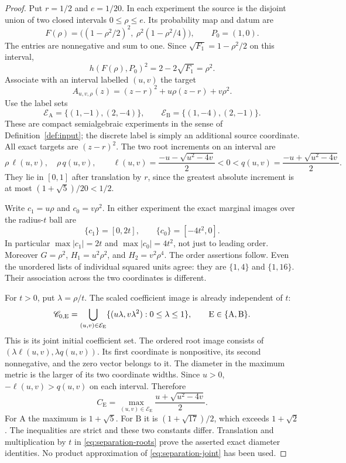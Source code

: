 \begin{proof}
Put $r=1/2$ and $e=1/20$. In each experiment the source is the disjoint
union of two closed intervals $0\le\rho\le e$. Its probability map and
datum are
\[
 F(\rho)=\bigl((1-\rho^2/2)^2,\ \rho^2(1-\rho^2/4)\bigr),
 \qquad P_0=(1,0).
\]
The entries are nonnegative and sum to one. Since
$\sqrt{F_1}=1-\rho^2/2$ on this interval,
\[
 h(F(\rho),P_0)^2=2-2\sqrt{F_1}=\rho^2.
\]
Associate with an interval labelled $(u,v)$ the target
\[
 A_{u,v,\rho}(z)=(z-r)^2+u\rho(z-r)+v\rho^2.
\]
Use the label sets
\[
 \mathcal E_{\mathrm A}=\{(1,-1),(2,-4)\},\qquad
 \mathcal E_{\mathrm B}=\{(1,-4),(2,-1)\}.
\]
These are compact semialgebraic experiments in the sense of
Definition~\ref{def:input}; the discrete label is simply an additional
source coordinate. All exact targets are $(z-r)^2$. The two root
increments on an interval are
\begin{equation}\label{eq:separation-roots}
 \rho\,\ell(u,v),\quad\rho\,q(u,v),\qquad
 \ell(u,v)=\frac{-u-\sqrt{u^2-4v}}2<0<
 q(u,v)=\frac{-u+\sqrt{u^2-4v}}2.
\end{equation}
They lie in $[0,1]$ after translation by $r$, since the greatest absolute
increment is at most $(1+\sqrt5)/20<1/2$.

Write $c_1=u\rho$ and $c_0=v\rho^2$. In either experiment the exact
marginal images over the radius-$t$ ball are
\[
 \{c_1\}=[0,2t],\qquad \{c_0\}=[-4t^2,0].
\]
In particular $\max|c_1|=2t$ and $\max|c_0|=4t^2$, not just to leading
order. Moreover $G=\rho^2$, $H_1=u^2\rho^2$, and
$H_2=v^2\rho^4$. The order assertions follow. Even the unordered lists
of individual squared units agree: they are $\{1,4\}$ and $\{1,16\}$.
Their association across the two coordinates is different.

For $t>0$, put $\lambda=\rho/t$. The scaled coefficient image is already
independent of $t$:
\begin{equation}\label{eq:separation-joint}
 \mathscr C_{0,\mathrm E}=
 \bigcup_{(u,v)\in\mathcal E_{\mathrm E}}
       \{(u\lambda,v\lambda^2):0\le\lambda\le1\},
 \qquad \mathrm E\in\{\mathrm A,\mathrm B\}.
\end{equation}
This is its joint initial coefficient set. The ordered root image consists
of $(\lambda\ell(u,v),\lambda q(u,v))$. Its first coordinate is
nonpositive, its second nonnegative, and the zero vector belongs to it.
The diameter in the maximum metric is the larger of its two coordinate
widths. Since $u>0$, $-\ell(u,v)>q(u,v)$ on each interval. Therefore
\[
 C_{\mathrm E}=\max_{(u,v)\in\mathcal E_{\mathrm E}}
                     \frac{u+\sqrt{u^2-4v}}2.
\]
For $\mathrm A$ the maximum is $1+\sqrt5$. For $\mathrm B$ it is
$(1+\sqrt{17})/2$, which exceeds $1+\sqrt2$.
The inequalities are strict and these two constants differ. Translation
and multiplication by $t$ in \eqref{eq:separation-roots} prove the asserted
exact diameter identities. No product approximation of
\eqref{eq:separation-joint} has been used.
\end{proof}

